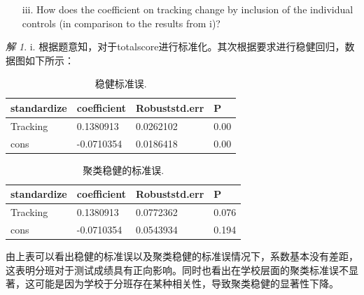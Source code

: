 \documentclass[a4paper]{ctexart}
\theoremstyle{remark}
\newtheorem*{solution}{解}
\begin{document}
\begin{itemize}
\begin{enumerate}
\item[iii.]  How does the coefficient on tracking change by inclusion of the individual controls (in comparison to the results from i)?
\end{enumerate}



\begin{solution}
    i. 根据题意知，对于totalscore进行标准化。其次根据要求进行稳健回归，数据图如下所示：\\
    \begin{table}[h]
        \centering
        \begin{threeparttable}%
            \begin{tabular}{llll}%
                \hline
                standardize & coefficient & Robuststd.err & P \\
                \hline
                Tracking & 0.1380913 & 0.0262102 & 0.00 \\
                cons  &  -0.0710354 & 0.0186418  & 0.00\\
                \hline
            \end{tabular} 
        \end{threeparttable}
        \caption{\label{font-table} 稳健标准误. }
    \end{table}

    \begin{table}[h]
        \centering
        \begin{threeparttable}%
            \begin{tabular}{llll}%
                \hline
                standardize & coefficient & Robuststd.err & P \\
                \hline
                Tracking & 0.1380913 & 0.0772362 & 0.076 \\
                cons  & -0.0710354 & 0.0543934 & 0.194\\
                \hline
            \end{tabular} 
        \end{threeparttable}
        \caption{\label{font-table} 聚类稳健的标准误. }
    \end{table}
    由上表可以看出稳健的标准误以及聚类稳健的标准误情况下，系数基本没有差距，这表明分班对于测试成绩具有正向影响。同时也看出在学校层面的聚类标准误不显著，这可能是因为学校于分班存在某种相关性，导致聚类稳健的显著性下降。






\end{solution}
\end{itemize}
\end{document}
